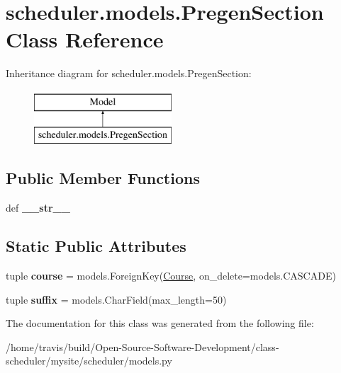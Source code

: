 \hypertarget{classscheduler_1_1models_1_1_pregen_section}{\section{scheduler.\-models.\-Pregen\-Section Class Reference}
\label{classscheduler_1_1models_1_1_pregen_section}
}
Inheritance diagram for scheduler.\-models.\-Pregen\-Section\-:\begin{figure}[H]
\begin{center}
\leavevmode
\includegraphics[height=2.000000cm]{classscheduler_1_1models_1_1_pregen_section}
\end{center}
\end{figure}
\subsection*{Public Member Functions}
\begin{DoxyCompactItemize}
\item 
\hypertarget{classscheduler_1_1models_1_1_pregen_section_a0f46c875c91c38646fdefea75fb5d652}{def {\bfseries \-\_\-\-\_\-str\-\_\-\-\_\-}}\label{classscheduler_1_1models_1_1_pregen_section_a0f46c875c91c38646fdefea75fb5d652}

\end{DoxyCompactItemize}
\subsection*{Static Public Attributes}
\begin{DoxyCompactItemize}
\item 
\hypertarget{classscheduler_1_1models_1_1_pregen_section_a3eafd0071b89cf3573c5f47c9194f848}{tuple {\bfseries course} = models.\-Foreign\-Key(\hyperlink{classscheduler_1_1models_1_1_course}{Course}, on\-\_\-delete=models.\-C\-A\-S\-C\-A\-D\-E)}\label{classscheduler_1_1models_1_1_pregen_section_a3eafd0071b89cf3573c5f47c9194f848}

\item 
\hypertarget{classscheduler_1_1models_1_1_pregen_section_ae51c6af4b08756b861dc5fe9bec2e203}{tuple {\bfseries suffix} = models.\-Char\-Field(max\-\_\-length=50)}\label{classscheduler_1_1models_1_1_pregen_section_ae51c6af4b08756b861dc5fe9bec2e203}

\end{DoxyCompactItemize}


The documentation for this class was generated from the following file\-:\begin{DoxyCompactItemize}
\item 
/home/travis/build/\-Open-\/\-Source-\/\-Software-\/\-Development/class-\/scheduler/mysite/scheduler/models.\-py\end{DoxyCompactItemize}
